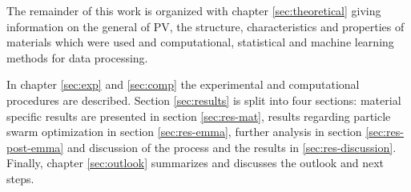 The remainder of this work is organized with chapter 
\ref{sec:theoretical} giving 
information on the general  of PV, the structure, characteristics and properties of materials which were used and computational, statistical and machine learning methods for data processing. 

In chapter \ref{sec:exp} and \ref{sec:comp} the experimental and computational procedures are described. 
Section \ref{sec:results} is split into four sections: material specific results are presented in section \ref{sec:res-mat}, results regarding particle swarm optimization in section \ref{sec:res-emma}, further analysis in section \ref{sec:res-post-emma} and discussion of the process and the results in \ref{sec:res-discussion}.
Finally, chapter \ref{sec:outlook} summarizes and discusses the outlook and next steps.

